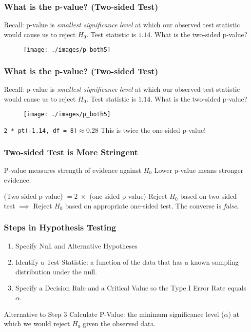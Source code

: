 \documentclass{beamer}
\begin{document}
\begin{frame}
\frametitle{What is the p-value? (Two-sided Test)}
\footnotesize
Recall: p-value is \emph{smallest significance level} at which our observed test statistic would cause us to reject $H_0$. \alert{Test statistic is $1.14$. What is the two-sided p-value? }
\begin{figure}
\texttt{[image: ./images/p\_both5]}

\end{figure}

\end{frame}

\begin{frame}
\frametitle{What is the p-value? (Two-sided Test)}
\footnotesize
Recall: p-value is \emph{smallest significance level} at which our observed test statistic would cause us to reject $H_0$. \alert{Test statistic is $1.14$. What is the two-sided p-value? }
\begin{figure}
\texttt{[image: ./images/p\_both5]}
\end{figure}

\texttt{2 * pt(-1.14, df = 8)}$\approx 0.28$ \pause \hfill \alert{This is twice the one-sided p-value!}
\end{frame}


\begin{frame}
\frametitle{Two-sided Test is More Stringent}
\begin{block}{P-value measures strength of evidence against $H_0$}
Lower p-value means stronger evidence. 
\end{block}

\begin{block}{(Two-sided p-value) $= 2 \; \times$  (one-sided p-value)}
Reject $H_0$ based on two-sided test $\implies$ Reject $H_0$ based on appropriate one-sided test. The converse is \emph{false}.
\end{block}


\end{frame}

\begin{frame}
\frametitle{Steps in Hypothesis Testing}

\begin{enumerate}
\item Specify Null and Alternative Hypotheses
\item Identify a Test Statistic: a function of the data that has a known sampling distribution under the null.
\item Specify a Decision Rule and a Critical Value so the Type I Error Rate equals $\alpha$.
\end{enumerate}

\begin{alertblock}{Alternative to Step 3}
	Calculate P-Value: the minimum significance level  ($\alpha$) at which we would reject $H_0$ given the observed data.
\end{alertblock}

\end{frame}
\end{document}

